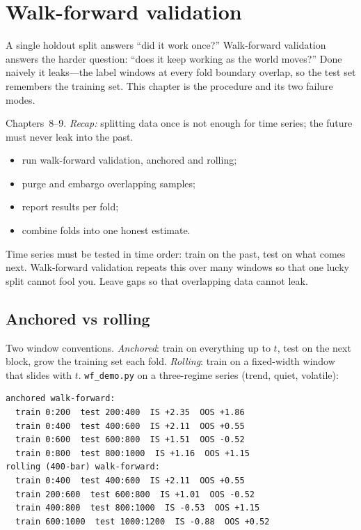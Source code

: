 \chapter{Walk-forward validation}\label{ch:walkfwd}

\noindent A single holdout split answers ``did it work once?'' Walk-forward validation
answers the harder question: ``does it keep working as the world moves?'' Done naively
it leaks---the label windows at every fold boundary overlap, so the test set remembers
the training set. This chapter is the procedure and its two failure modes.

\begin{rulebox}
Chapters~8--9. \emph{Recap:} splitting data once is not enough for time series; the future must never leak into the past.
\end{rulebox}
\begin{wins}
\begin{itemize}
\item run walk-forward validation, anchored and rolling;
\item purge and embargo overlapping samples;
\item report results per fold;
\item combine folds into one honest estimate.
\end{itemize}
\end{wins}
\begin{principle}
Time series must be tested in time order: train on the past, test on what comes next. Walk-forward validation repeats this over many windows so that one lucky split cannot fool you. Leave gaps so that overlapping data cannot leak.
\end{principle}

\section{Anchored vs rolling}\label{sec:wftypes}

Two window conventions. \emph{Anchored}: train on everything up to $t$, test on the next
block, grow the training set each fold. \emph{Rolling}: train on a fixed-width window
that slides with $t$. \texttt{wf\_demo.py} on a three-regime series (trend, quiet,
volatile):
\begin{lstlisting}[numbers=none]
anchored walk-forward:
  train 0:200  test 200:400  IS +2.35  OOS +1.86
  train 0:400  test 400:600  IS +2.11  OOS +0.55
  train 0:600  test 600:800  IS +1.51  OOS -0.52
  train 0:800  test 800:1000  IS +1.16  OOS +1.15
rolling (400-bar) walk-forward:
  train 0:400  test 400:600  IS +2.11  OOS +0.55
  train 200:600  test 600:800  IS +1.01  OOS -0.52
  train 400:800  test 800:1000  IS -0.53  OOS +1.15
  train 600:1000  test 1000:1200  IS -0.88  OOS +0.52
\end{lstlisting}

